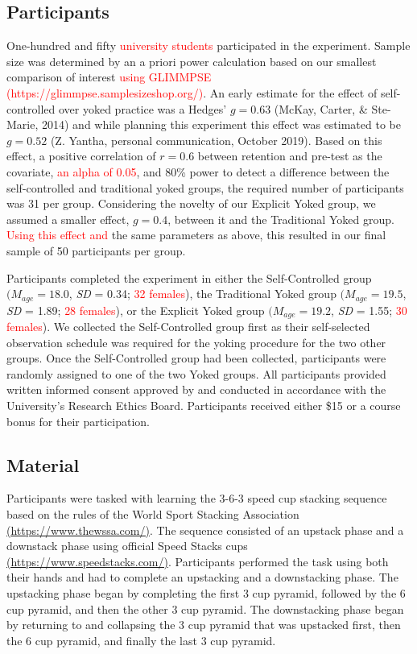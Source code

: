 \documentclass[
  english,
  man, donotrepeattitle,floatsintext]{apa7}
\begin{document}
\hypertarget{participants}{%
\subsection{Participants}\label{participants}}

One-hundred and fifty \textcolor{red}{university students} participated in the experiment. Sample size was determined by an a priori power calculation based on our smallest comparison of interest \textcolor{red}{using GLIMMPSE (https://glimmpse.samplesizeshop.org/)}. An early estimate for the effect of self-controlled over yoked practice was a Hedges' \(g = 0.63\) (McKay, Carter, \& Ste-Marie, 2014) and while planning this experiment this effect was estimated to be \(g = 0.52\) (Z. Yantha, personal communication, October 2019). Based on this effect, a positive correlation of \(r = 0.6\) between retention and pre-test as the covariate, \textcolor{red}{an alpha of 0.05}, and 80\% power to detect a difference between the self-controlled and traditional yoked groups, the required number of participants was 31 per group. Considering the novelty of our Explicit Yoked group, we assumed a smaller effect, \(g = 0.4\), between it and the Traditional Yoked group. \textcolor{red}{Using this effect and} the same parameters as above, this resulted in our final sample of 50 participants per group.

Participants completed the experiment in either the Self-Controlled group \((M_{age} = 18.0\), \emph{SD} = 0.34; \textcolor{red}{32 females}), the Traditional Yoked group \((M_{age} = 19.5\), \emph{SD} = 1.89; \textcolor{red}{28 females}), or the Explicit Yoked group \((M_{age} = 19.2\), \emph{SD} = 1.55; \textcolor{red}{30 females}). We collected the Self-Controlled group first as their self-selected observation schedule was required for the yoking procedure for the two other groups. Once the Self-Controlled group had been collected, participants were randomly assigned to one of the two Yoked groups. All participants provided written informed consent approved by and conducted in accordance with the University's Research Ethics Board. Participants received either \$15 or a course bonus for their participation.

\hypertarget{material}{%
\subsection{Material}\label{material}}

Participants were tasked with learning the 3-6-3 speed cup stacking sequence based on the rules of the World Sport Stacking Association \href{https://www.thewssa.com/}{(https://www.thewssa.com/)}. The sequence consisted of an upstack phase and a downstack phase using official Speed Stacks cups \href{https://www.speedstacks.com/}{(https://www.speedstacks.com/)}. Participants performed the task using both their hands and had to complete an upstacking and a downstacking phase. The upstacking phase began by completing the first 3 cup pyramid, followed by the 6 cup pyramid, and then the other 3 cup pyramid. The downstacking phase began by returning to and collapsing the 3 cup pyramid that was upstacked first, then the 6 cup pyramid, and finally the last 3 cup pyramid.
\end{document}
